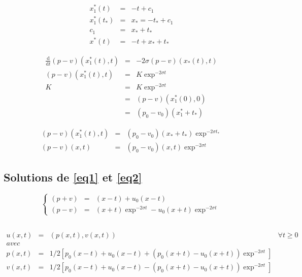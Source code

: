 \documentclass[a4paper,11pt]{article}
\begin{document}
\begin{equation*}
\begin{array}{rcl}
    x_{1}^{*}(t) &=& -t +c_{1} \\
    x_{1}^{*}(t_{*}) &=& x_{*} = -t_{*}+c_{1} \\
    c_{1} &=& x_{*} + t_{*} \\
    x^{*}(t) &=& -t + x_{*} + t_{*}
\end{array}
\end{equation*}

\begin{equation*}
\begin{array}{rcl}
    \frac{\mathrm{d}}{\mathrm{d}t}(p-v)(x_{1}^{*}(t), t) &=& -2\sigma (p-v)(x_{*}(t), t) \\
    (p-v)(x_{1}^{*}(t), t) &=& K \exp^{-2\sigma t} \\
    K &=& K \exp^{-2\sigma t} \\
    &=& (p-v)(x_{1}^{*}(0), 0) \\
    &=& (p_{0}-v_{0})(x_{1}^{*} + t_{*})
\end{array}
\end{equation*}

\begin{equation*}
\begin{array}{rcl}
    (p-v)(x_{1}^{*}(t), t) &=& (p_{0}-v_{0})(x_{*} + t_{*})\exp^{-2\sigma t_{*}} \\
    (p-v)(x,t) &=& (p_{0}-v_{0})(x,t)\exp^{-2\sigma t}
\end{array}
\end{equation*}

\subsection*{Solutions de \ref{eq1} et \ref{eq2}}

\begin{equation*}
\left\{
\begin{array}{rcl}
    (p+v) &=& (x - t) + u_{0}(x - t) \\
    (p-v) &=& (x + t) \exp^{-2\sigma t} - u_{0}(x + t) \exp^{-2\sigma t}
\end{array}
\right.
\end{equation*}

\subsection*{}

\begin{equation}
\begin{array}{rcll}
    u(x,t) &=& (p(x,t), v(x,t)) & \forall t \ge 0 \\
    avec & & & \\
    p(x,t) &=& 1/2\left[p_{0}(x - t) + u_{0}(x - t) + (p_{0}(x + t) - u_{0}(x + t))\exp^{-2\sigma t} \right] & \\
    v(x,t) &=& 1/2\left[p_{0}(x - t) + u_{0}(x - t) - (p_{0}(x + t) - u_{0}(x + t))\exp^{-2\sigma t} \right] &
\end{array}
\end{equation}
\end{document}
